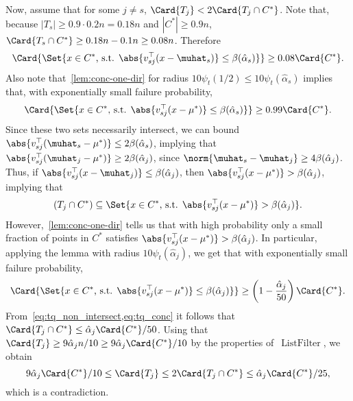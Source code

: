 Now, assume that for some \(j \neq s\), \(\Card{T_j} < 2 \Card{T_j \cap C^{\ast}}\).
Note that, because $|T_s| \geq 0.9 \cdot 0.2 n = 0.18n$ and $|C^*| \geq 0.9 n$, \(\Card{T_s \cap C^*} \geq 0.18n - 0.1n \geq 0.08n\). Therefore
\begin{equation*}
    \Card{\Set{x \in C^{\ast} \text{, s.t. } \abs{v_{sj}^{\top}(x - \muhat_s)} \leq \beta(\hat \alpha_s)}} \geq 0.08 \Card{C^{\ast}}.
\end{equation*}
Also note that~\cref{lem:conc-one-dir} for radius \(10 \psi_t(1/2) \leq 10 \psi_t(\hat \alpha_s)\) implies that, with exponentially small failure probability,
\begin{equation*}
    \Card{\Set{x \in C^{\ast} \text{, s.t. } \abs{v_{sj}^{\top}(x - \mu^{\ast})} \leq \beta(\hat \alpha_s)}} \geq 0.99 \Card{C^{\ast}}.
\end{equation*}
Since these two sets necessarily intersect, we can bound \(\abs{v_{sj}^{\top}(\muhat_s - \mu^{\ast})} \leq 2\beta(\hat \alpha_s)\),
implying that \(\abs{v_{sj}^{\top}(\muhat_j - \mu^{\ast})} \geq 2\beta(\hat \alpha_j)\), since \(\norm{\muhat_s - \muhat_j} \geq 4\beta(\hat\alpha_j)\).
Thus, if \(\abs{v_{sj}^{\top}(x - \muhat_j)} \leq \beta(\hat \alpha_j)\), 
then \(\abs{v_{sj}^{\top}(x - \mu^{\ast})} > \beta(\hat \alpha_j)\), implying that 
\begin{equation}
    \label{eq:tq_non_intersect}
    (T_j \cap C^{\ast}) \subseteq \Set{x \in C^{\ast} \text{, s.t. } \abs{v_{sj}^{\top}(x - \mu^{\ast})} > \beta(\hat\alpha_j)}.
\end{equation}
However,~\cref{lem:conc-one-dir} tells us that with high probability only a small fraction of points in \(C^{\ast}\) satisfies \(\abs{v_{sj}^{\top}(x - \mu^{\ast})} > \beta(\hat \alpha_j)\).
In particular, applying the lemma with radius \(10 \psi_t(\hat \alpha_j)\), we get that with exponentially small failure probability, 
\begin{equation}
    \label{eq:tq_conc}
    \Card{\Set{x \in C^{\ast} \text{, s.t. } \abs{v_{sj}^{\top}(x - \mu^{\ast})} \leq \beta(\hat\alpha_j)}} 
    \geq \left(1 - \frac{\hat\alpha_j}{50}\right) \Card{C^{\ast}}.
\end{equation}
From~\cref{eq:tq_non_intersect,eq:tq_conc} it follows that \(\Card{T_j \cap C^{\ast}} \leq \hat \alpha_j \Card{C^{\ast}}  / 50\).
Using that \(\Card{T_j} \geq 9\hat \alpha_j n / 10 \geq 9\hat \alpha_j \Card{C^{\ast}} / 10\) by the properties of~\(\operatorname{ListFilter}\), we obtain 
\begin{equation*}
    9 \hat \alpha_j \Card{C^{\ast}} / 10\leq \Card{T_j} \leq 2 \Card{T_j \cap C^{\ast}} 
    \leq \hat \alpha_j \Card{C^{\ast}} / 25,
\end{equation*}
which is a contradiction.

